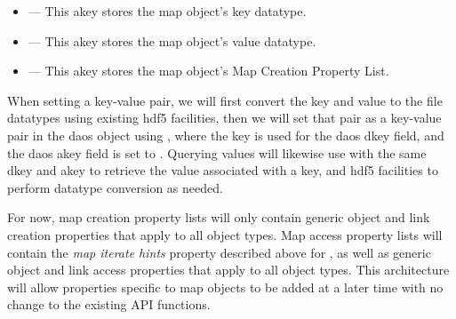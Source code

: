 \documentclass[../design_doc.tex]{subfiles}
\begin{document}
\begin{itemize}
 \item {} --- This \gls{akey} stores the map object's key datatype.
 \item {} --- This \gls{akey} stores the map object's value datatype.
 \item {} --- This \gls{akey} stores the map object's Map Creation Property List.
\end{itemize}

When setting a key-value pair, we will first convert the key and value to the file datatypes using existing \acrshort{hdf5} facilities, then we will set that pair as a key-value pair in the \acrshort{daos} object using , where the key is used for the \acrshort{daos} \gls{dkey} field, and the \acrshort{daos} \gls{akey} field is set to . Querying values will likewise use  with the same \gls{dkey} and \gls{akey} to retrieve the value associated with a key, and \acrshort{hdf5} facilities to perform datatype conversion as needed.

For now, map creation property lists will only contain generic object and link creation properties that apply to all object types. Map access property lists will contain the \textit{map iterate hints} property described above for , as well as generic object and link access properties that apply to all object types. This architecture will allow properties specific to map objects to be added at a later time with no change to the existing API functions.
\end{document}
